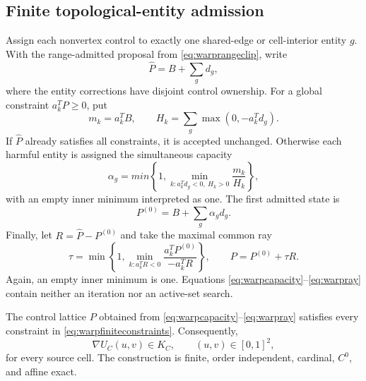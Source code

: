 \subsection{Finite topological-entity admission}

Assign each nonvertex control to exactly one shared-edge or cell-interior
entity \(g\).  With the range-admitted proposal from
\eqref{eq:warprangeclip}, write
\begin{equation}
 \widehat P=B+\sum_gd_g,
 \label{eq:warpgroups}
\end{equation}
where the entity corrections have disjoint control ownership.  For a global
constraint \(a_k^TP\geq0\), put
\begin{equation}
 m_k=a_k^TB,\qquad
 H_k=\sum_g\max(0,-a_k^Td_g).
 \label{eq:warpmargin}
\end{equation}
If \(\widehat P\) already satisfies all constraints, it is accepted
unchanged.  Otherwise each harmful entity is assigned the simultaneous
capacity
\begin{equation}
 \alpha_g=min\!\left\{1,
  \min_{k:a_k^Td_g<0,\ H_k>0}\frac{m_k}{H_k}\right\},
 \label{eq:warpcapacity}
\end{equation}
with an empty inner minimum interpreted as one.  The first admitted state is
\begin{equation}
 P^{(0)}=B+\sum_g\alpha_gd_g.
 \label{eq:warpfirststate}
\end{equation}
Finally, let \(R=\widehat P-P^{(0)}\) and take the maximal common ray
\begin{equation}
 \tau=\min\!\left\{1,
   \min_{k:a_k^TR<0}
   \frac{a_k^TP^{(0)}}{-a_k^TR}\right\},
 \qquad P=P^{(0)}+\tau R.
 \label{eq:warpray}
\end{equation}
Again, an empty inner minimum is one.  Equations
\eqref{eq:warpcapacity}--\eqref{eq:warpray} contain neither an iteration nor
an active-set search.

\begin{theorem}
The control lattice \(P\) obtained from
\eqref{eq:warpcapacity}--\eqref{eq:warpray} satisfies every constraint in
\eqref{eq:warpfiniteconstraints}.  Consequently,
\begin{equation}
 \nabla U_C(u,v)\in K_C,
 \qquad (u,v)\in[0,1]^2,
 \label{eq:warpgradientcone}
\end{equation}
for every source cell.  The construction is finite, order independent,
cardinal, \(C^0\), and affine exact.
\end{theorem}

